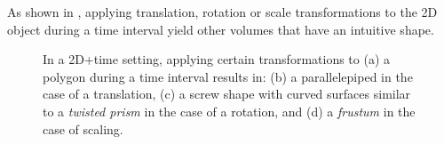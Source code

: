 As shown in , applying translation, rotation or scale transformations to the 2D object during a time interval yield other volumes that have an intuitive shape.
\begin{figure}[tbp]
\centering
{}
\caption[Object transformations in 2D space+time]{In a 2D+time setting, applying certain transformations to (a) a polygon during a time interval results in: (b) a parallelepiped in the case of a translation, (c) a screw shape with curved surfaces similar to a \emph{twisted prism} in the case of a rotation, and (d) a \emph{frustum} in the case of scaling.}
\label{fig:aula-transformations}
\end{figure}

